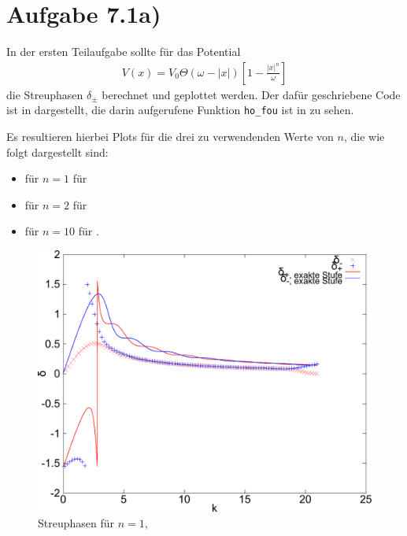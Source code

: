 \section*{Aufgabe 7.1a)}
In der ersten Teilaufgabe sollte für das Potential
\begin{eqnarray}
V(x) = V_0 \Theta(ω-|x|)\left[ 1-\frac{|x|^n}{ω} \right]
\end{eqnarray}
die Streuphasen $δ_{\pm}$ berechnet und geplottet werden. Der dafür geschriebene
Code ist in  dargestellt, die darin aufgerufene Funktion \texttt{ho\_fou}
ist in  zu sehen.




Es resultieren hierbei Plots für die drei zu verwendenden Werte von $n$, die wie
folgt dargestellt sind:
\begin{itemize}
\item für $n=1$ für 
\item für $n=2$ für 
\item für $n=10$ für .
\end{itemize}

\begin{figure}[htb]
  \centering
  \includegraphics[width=0.8\columnwidth,keepaspectratio]{../tmp/71a_n1-crop}
  \caption{Streuphasen für $n=1$, }
  \label{fig:n1}
\end{figure}

